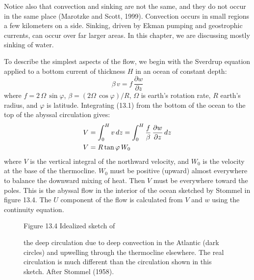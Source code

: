 Notice also that convection and sinking are not the same, and they do
not occur in the same place (Marotzke and Scott, 1999). Convection
occurs in small regions a few kilometers on a side. Sinking, driven by
Ekman pumping and geostrophic currents, can occur
over far larger areas. In this chapter, we are discussing mostly
sinking of water.

To describe the simplest aspects of the flow, we begin with the
Sverdrup equation applied to a bottom current of thickness $H$ in an
ocean of constant depth:
\begin{equation}
\beta\,v =f\,\frac{\partial{w}}{\partial{z}}
\end{equation}
where $f =2\,\Omega\,\sin \varphi$,
$\beta = \left(2\Omega\,\cos \varphi \right)/{R}$,
$\Omega$ is earth's rotation rate, $R$ earth's
radius, and $\varphi$ is latitude. Integrating (13.1) from the bottom
of the ocean to the top of the abyssal circulation gives:
\begin{align}
V &= \int_{0}^{H} v\,dz = \int_{0}^{H}
\frac{f}{\beta}\,\frac{\partial{w}}{\partial{z}}\,dz \notag \\
V &= R \tan \varphi \,W_0
\end{align}
where $V$ is the vertical integral of the northward velocity, and
$W_0$ is the velocity at the base of the
thermocline. $W_0$ must be
positive (upward) almost everywhere to balance the downward
mixing of heat. Then $V$ must be
everywhere toward the poles. This is the abyssal flow in the interior
of the ocean sketched by Stommel in figure 13.4.  The $U$ component of
the flow is calculated from $V$ and $w$ using the continuity equation.

\begin{figure}[t!]
{}
\footnotesize
Figure 13.4 Idealized sketch of \rule{0mm}{4ex}the deep circulation
due to deep convection in the Atlantic (dark circles) and
upwelling through the
thermocline elsewhere. The
real circulation is much different than the circulation shown in this
sketch. After Stommel (1958).

\label{fig:stommeldeep}
\vspace{-3ex}
\end{figure}

